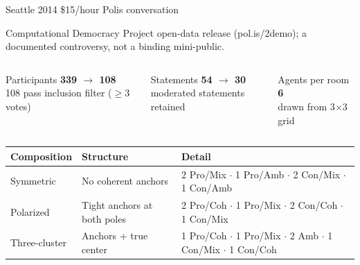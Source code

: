 \documentclass[aspectratio=169,11pt]{beamer}
\begin{document}
\begin{frame}{Seattle 2014 \$15/hour Polis conversation}

{\small Computational Democracy Project open-data release (pol.is/2demo); a documented controversy, not a binding mini-public.}

\vspace{0.3cm}
\begin{columns}[T]
\begin{block}{Participants}
\centering \textbf{\Large 339 $\to$ 108} \\
{\small 108 pass inclusion filter ($\geq 3$ votes)}
\end{block}

\begin{block}{Statements}
\centering \textbf{\Large 54 $\to$ 30} \\
{\small moderated statements retained}
\end{block}

\begin{block}{Agents per room}
\centering \textbf{\Large 6} \\
{\small drawn from 3$\times$3 grid}
\end{block}
\end{columns}

\vspace{0.3cm}
\begin{table}
\centering
\small
\begin{tabular}{lll}
\toprule
\textbf{Composition} & \textbf{Structure} & \textbf{Detail} \\
\midrule
Symmetric & No coherent anchors & 2 Pro/Mix $\cdot$ 1 Pro/Amb $\cdot$ 2 Con/Mix $\cdot$ 1 Con/Amb \\
Polarized & Tight anchors at both poles & 2 Pro/Coh $\cdot$ 1 Pro/Mix $\cdot$ 2 Con/Coh $\cdot$ 1 Con/Mix \\
Three-cluster & Anchors + true center & 1 Pro/Coh $\cdot$ 1 Pro/Mix $\cdot$ 2 Amb $\cdot$ 1 Con/Mix $\cdot$ 1 Con/Coh \\
\bottomrule
\end{tabular}
\end{table}

\end{frame}
\end{document}
